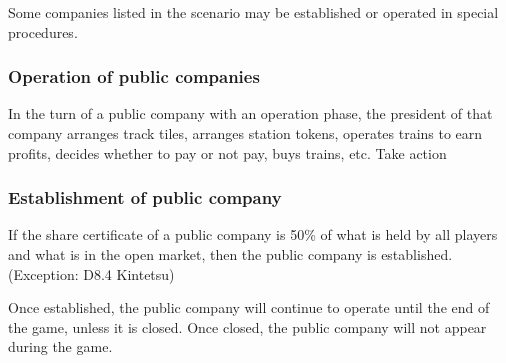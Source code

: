 \documentclass{article}
\begin{document}
\begin{CJK}{UTF8}{min}
Some companies listed in the scenario may be established or operated
in special procedures.

\subsubsection{Operation of public companies}
In the turn of a public company with an operation phase, the president
of that company arranges track tiles, arranges station tokens,
operates trains to earn profits, decides whether to pay or not pay,
buys trains, etc. Take action

\subsubsection{Establishment of public company}
If the share certificate of a public company is 50\% of what is held
by all players and what is in the open market, then the public company
is established. (Exception: D8.4 Kintetsu)

Once established, the public company will continue to operate until
the end of the game, unless it is closed. Once closed, the public
company will not appear during the game.










\end{CJK}
\end{document}
